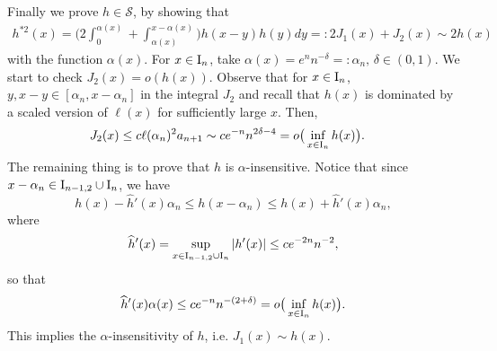\documentclass[12pt,leqno]{amsart}
\newcommand{\rI}{{\rm I}}
\newcommand{\wh}{\widehat}
\newcommand{\cals}{{\mathcal S}}
\newcommand{\1}{{\mathbf 1}}
\begin{document}
Finally we prove $h\in \cals$, by showing that %
\begin{align}
\label{h:j1:j2}
 h^{\ast 2}(x)= \Big(
2 \int_{0}^{\alpha(x)} +\int_{\alpha(x)}^{x-\alpha(x)} 
\Big) h(x-y)h(y)dy =:2J_1(x) + J_2(x) \sim 2 h(x)
\end{align}
with the function $\alpha(x)$. 
For $x\in \rI_n$, take $\alpha(x)=e^{n}n^{-\delta}=:\alpha_n,\,\delta\in(0,1)$. 
We start to check $J_2(x)=o(h(x))$.
Observe that for $x\in \rI_n$, $y,x-y\in [\alpha_n,x-\alpha_n]$ in the integral $J_2$ 
and recall that $h(x)$ is dominated by 
a scaled version of $\ell (x)$ for sufficiently large $x$. 
Then,
\begin{align*}
J_2(x) &\le c \ell (\alpha_n)^2 a_{n+1} 
 \sim c e^{-n}n^{2\delta -4}
= o\big(\inf_{x\in\rI_n} h(x)\big). 
\end{align*}
The remaining thing is to prove that $h$ is $\alpha$-insensitive. Notice that 
since $x-\alpha_n \in \rI_{n-1,2}\cup \rI_n$, we have 
\[
 h(x)-\wh h'(x)\alpha_n \le h(x-\alpha_n) \le h(x)+\wh h'(x)\alpha_n,
\]
where 
\[
 \wh h'(x)=\sup_{x \in \rI_{n-1,2}\cup \rI_n}|h'(x)| \le ce^{-2n}n^{-2},
\]
so that 
\[
 \wh h'(x) \alpha(x) \le %
c e^{-n} n^{-(2+\delta)}=o\big(\inf_{x\in \rI_n} h(x)\big).
\]
This implies the $\alpha$-insensitivity of $h$, i.e. $J_1(x)\sim h(x)$.  
\end{document}
